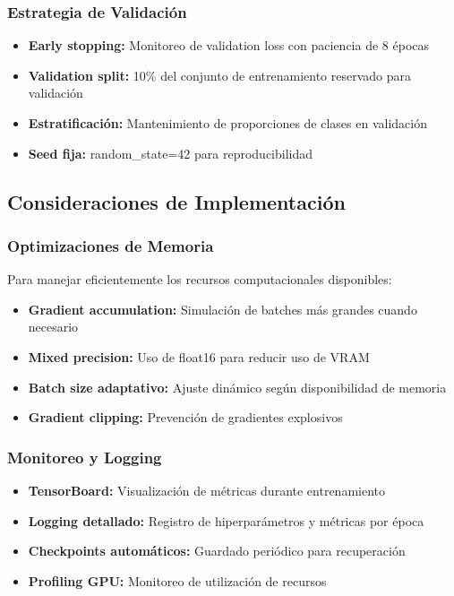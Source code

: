 \subsubsection{Estrategia de Validación}

\begin{itemize}
    \item \textbf{Early stopping:} Monitoreo de validation loss con paciencia de 8 épocas
    \item \textbf{Validation split:} 10\% del conjunto de entrenamiento reservado para validación
    \item \textbf{Estratificación:} Mantenimiento de proporciones de clases en validación
    \item \textbf{Seed fija:} random\_state=42 para reproducibilidad
\end{itemize}

\subsection{Consideraciones de Implementación}

\subsubsection{Optimizaciones de Memoria}

Para manejar eficientemente los recursos computacionales disponibles:

\begin{itemize}
    \item \textbf{Gradient accumulation:} Simulación de batches más grandes cuando necesario
    \item \textbf{Mixed precision:} Uso de float16 para reducir uso de VRAM
    \item \textbf{Batch size adaptativo:} Ajuste dinámico según disponibilidad de memoria
    \item \textbf{Gradient clipping:} Prevención de gradientes explosivos
\end{itemize}

\subsubsection{Monitoreo y Logging}

\begin{itemize}
    \item \textbf{TensorBoard:} Visualización de métricas durante entrenamiento
    \item \textbf{Logging detallado:} Registro de hiperparámetros y métricas por época
    \item \textbf{Checkpoints automáticos:} Guardado periódico para recuperación
    \item \textbf{Profiling GPU:} Monitoreo de utilización de recursos
\end{itemize}

